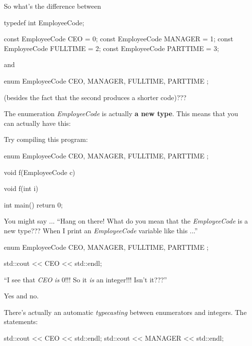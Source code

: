 \newpage{}

So what's the difference between

\begin{consolethree}[escapeinside=||]
typedef int EmployeeCode;

const EmployeeCode CEO = 0;
const EmployeeCode MANAGER = 1;
const EmployeeCode FULLTIME = 2;
const EmployeeCode PARTTIME = 3;
\end{consolethree}

and

\begin{consolethree}[escapeinside=||]
enum EmployeeCode
{
    CEO, MANAGER, FULLTIME, PARTTIME
};
\end{consolethree}

(besides the fact that the second produces a shorter code)???

The enumeration \textit{EmployeeCode} is actually \textbf{a new
type}. This means that you can actually have this:

\begin{ex}
Try compiling this program:

\begin{consolethree}[escapeinside=||]
enum EmployeeCode
{
    CEO, MANAGER, FULLTIME, PARTTIME
};

void f(EmployeeCode c)
{}

void f(int i)
{}

int main()
{
    return 0;
}
\end{consolethree}
\end{ex}


\newpage{}

You might say ... ``Hang on there! What do you mean that the
\textit{EmployeeCode} is a new type??? When I print an \textit{EmployeeCode}
variable like this ...''

\begin{consolethree}[escapeinside=||]
enum EmployeeCode
{
    CEO, MANAGER, FULLTIME, PARTTIME
};

std::cout << CEO << std::endl;
\end{consolethree}

``I see that \textit{CEO} \textit{is} 0!!! So it \textit{is} an integer!!!
Isn't it???''

Yes and no.

There's actually an automatic \textit{typecasting} between
enumerators and integers. The statements:

\begin{consolethree}[escapeinside=||]
std::cout << CEO << std::endl;
std::cout << MANAGER << std::endl;
\end{consolethree}

